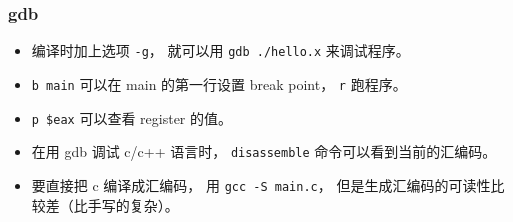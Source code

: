 \subsubsection{gdb}
\begin{itemize}
\item 编译时加上选项 \verb|-g|， 就可以用 \verb|gdb ./hello.x| 来调试程序。
\item \verb|b main| 可以在 main 的第一行设置 break point， \verb|r| 跑程序。
\item \verb|p $eax| 可以查看 register 的值。
\item 在用 gdb 调试 c/c++ 语言时， \verb|disassemble| 命令可以看到当前的汇编码。
\item 要直接把 c 编译成汇编码， 用 \verb|gcc -S main.c|， 但是生成汇编码的可读性比较差（比手写的复杂）。
\end{itemize}
